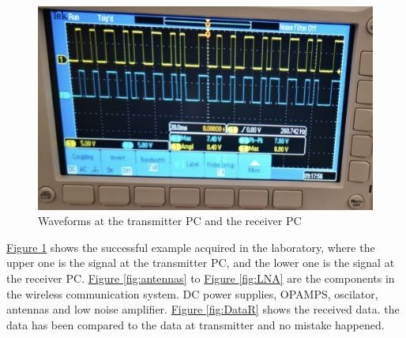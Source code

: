 \documentclass[12pt,a4paper]{report}
\begin{document}
\begin{figure}[ht]
    \centerline{\includegraphics[scale=1]{raw_waveform_compare}}
    \caption{Waveforms at the transmitter PC and the receiver PC}
    \label{fig:raw_bit_waveform}
\end{figure}



\hyperref[fig:raw_bit_waveform]{Figure \ref*{fig:raw_bit_waveform}} shows the successful example acquired in the laboratory, where the upper one is the signal at the transmitter PC, and the lower one is the signal at the receiver PC.
\hyperref[fig:antennas]{Figure \ref*{fig:antennas}} to \hyperref[fig:LNA]{Figure \ref*{fig:LNA}} are the components in the wireless communication system. DC power supplies, OPAMPS, oscilator, antennas and low noise amplifier. 
\hyperref[fig:DataR]{Figure \ref*{fig:DataR}} shows the received data. the data has been compared to the data at transmitter and no mistake happened.
\end{document}

